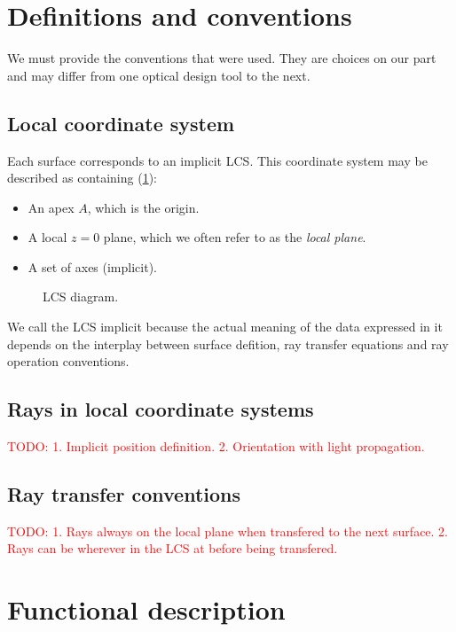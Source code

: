 \section{Definitions and conventions}
We must provide the conventions that were used. They are choices
on our part and may differ from one optical design tool to the next.

\subsection{Local coordinate system}
Each surface corresponds to an implicit \gls{LCS}.
This coordinate system may be described as containing (\cref{fig:LCS}):

\begin{itemize}
\item An apex $A$, which is the origin.
\item A local $z=0$ plane, which we often refer to as the \emph{local plane}.
\item A set of axes (implicit).
\end{itemize}

\begin{figure} \caption{\label{fig:LCS} LCS diagram.}

\end{figure}

We call the \gls{LCS} implicit because the actual meaning of the data
expressed in it depends on the interplay between surface defition, ray
transfer equations and ray operation conventions.

\subsection{Rays in local coordinate systems}
\textcolor{red}{TODO:
1. Implicit position definition.
2. Orientation with light propagation.}

\subsection{Ray transfer conventions}
\textcolor{red}{TODO:
1. Rays always on the local plane when transfered to the next surface.
2. Rays can be wherever in the LCS at before being transfered.}

\section{Functional description}

